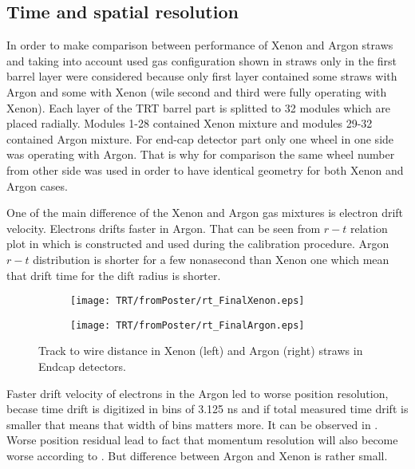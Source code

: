\subsection{Time and spatial resolution}
\label{subsec:TRT:trackPerf}

In order to make comparison between performance of Xenon and Argon straws and taking into account used gas configuration shown in  
straws only in the first barrel layer were considered because only first layer contained some straws with Argon and some with Xenon 
(wile second and third were fully operating with Xenon).
Each layer of the TRT barrel part is splitted to 32 modules which are placed radially. 
Modules 1-28 contained Xenon mixture and modules 29-32 contained Argon mixture.
For end-cap detector part only one wheel in one side was operating with Argon. That is why for comparison the same wheel number from other side was used in order
to have identical geometry for both Xenon and Argon cases.

One of the main difference of the Xenon and Argon gas mixtures is electron drift velocity. Electrons drifts faster in Argon. 
That can be seen from $r-t$ relation plot in  which is constructed and used during the calibration procedure.
Argon $r-t$ distribution is shorter for a few nonasecond than Xenon one which mean that drift time for the dift radius is shorter.

\begin{figure}
\begin{subfigure}{.5\textwidth}
  \centering
  \texttt{[image: TRT/fromPoster/rt\_FinalXenon.eps]}
\end{subfigure}%
\begin{subfigure}{.5\textwidth}
  \centering
  \texttt{[image: TRT/fromPoster/rt\_FinalArgon.eps]}
\end{subfigure}

\caption{Track to wire distance in Xenon (left) and Argon (right) straws in Endcap detectors.}
  \label{fig:RT_xenon_argon}
\end{figure}

Faster drift velocity of electrons in the Argon led to worse position resolution,
becase time drift is digitized in bins of 3.125 ns and if total measured time drift is smaller that means that width of bins matters more.
It can be observed in . Worse position residual lead to fact that momentum resolution will also become worse according to
. But difference between Argon and Xenon is rather small.

